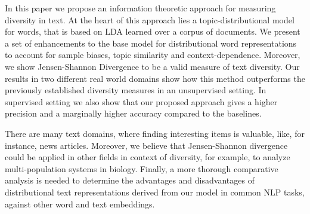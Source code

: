In this paper we propose an information theoretic approach for
measuring diversity in text. At the heart of this approach lies a
topic-distributional model for words, that is based on LDA learned
over a corpus of documents. We present a set of enhancements to the
base model for distributional word representations to account for sample
biases, topic similarity and context-dependence. Moreover, we
show Jensen-Shannon Divergence to be a valid measure of text
diversity. Our results in two different real 
world domains show how this method outperforms the previously
established diversity measures in an unsupervised setting. In
supervised setting we also show that our proposed approach gives a
higher precision and a marginally higher accuracy compared to the
baselines.  

There are many text domains, where finding interesting items is valuable, 
like, for instance, news articles. Moreover, we believe that Jensen-Shannon 
divergence could be applied in other fields in context of diversity, for example, 
to analyze multi-population systems in biology. Finally, a more thorough comparative analysis 
is needed to determine the advantages and disadvantages of distributional text 
representations derived from our model in common NLP tasks, 
against other word and text embeddings.

 
